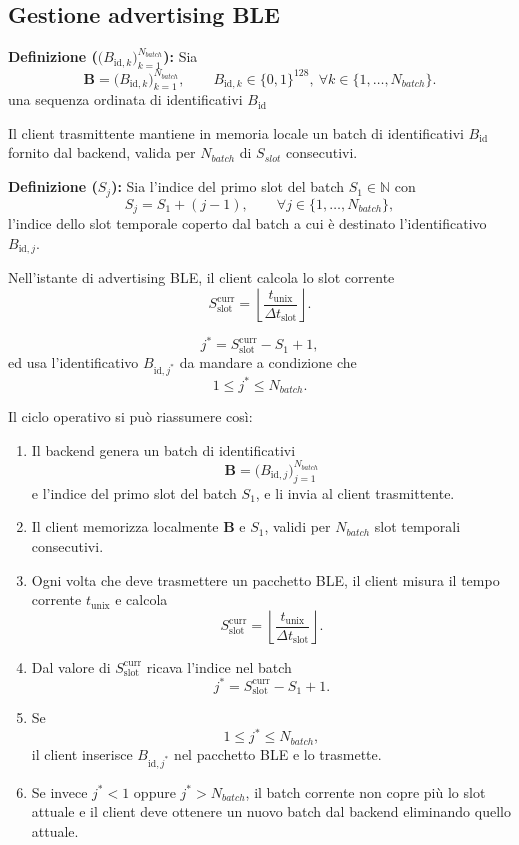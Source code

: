 \documentclass[a4paper,11pt]{article}
\begin{document}
\subsection{Gestione advertising BLE}
\textbf{Definizione (\(\bigl(B_{\text{id},k}\bigr)_{k=1}^{N_{batch}}\)):} Sia
\[
  \mathbf{B}
  = \bigl(B_{\text{id},k}\bigr)_{k=1}^{N_{batch}},
  \qquad B_{\text{id},k} \in \{0,1\}^{128},\ \forall k \in \{1,\dots,N_{batch}\}.
\]
una sequenza ordinata di identificativi $B_{\text{id}}$

Il client trasmittente mantiene in memoria locale un batch di identificativi \(B_{\text{id}}\) fornito dal backend, valida per $N_{batch}$ di $S_{slot}$ consecutivi.

\textbf{Definizione (\(S_j\)):} Sia l'indice del primo slot del batch \(S_1 \in \mathbb{N}\) con
\[
  S_j = S_1 + (j-1), \qquad \forall j \in \{1,\dots,N_{batch}\},
\]
l'indice dello slot temporale coperto dal batch a cui è destinato l'identificativo \(B_{\text{id},j}\).

Nell'istante di advertising BLE, il client calcola lo slot corrente
\[
  S_{\text{slot}}^{\text{curr}}
  = \left\lfloor \frac{t_{\text{unix}}}{\Delta t_{\text{slot}}} \right\rfloor.
\]

\[
  j^\ast = S_{\text{slot}}^{\text{curr}} - S_1 + 1,
\]
ed usa l'identificativo \(B_{\text{id},j^\ast}\) da mandare a condizione che
\[
  1 \le j^\ast \le N_{batch}.
\]

Il ciclo operativo si può riassumere così:
\begin{enumerate}
  \item Il backend genera un batch di identificativi
        \[
          \mathbf{B} = \bigl(B_{\text{id},j}\bigr)_{j=1}^{N_{batch}}
        \]
        e l'indice del primo slot del batch \(S_1\), e li invia al client trasmittente.

  \item Il client memorizza localmente \(\mathbf{B}\) e \(S_1\), validi per \(N_{batch}\) slot temporali consecutivi.

  \item Ogni volta che deve trasmettere un pacchetto BLE, il client misura il tempo corrente \(t_{\text{unix}}\) e calcola
        \[
          S_{\text{slot}}^{\text{curr}}
          = \left\lfloor \frac{t_{\text{unix}}}{\Delta t_{\text{slot}}} \right\rfloor.
        \]

  \item Dal valore di \(S_{\text{slot}}^{\text{curr}}\) ricava l’indice nel batch
        \[
          j^\ast = S_{\text{slot}}^{\text{curr}} - S_1 + 1.
        \]

  \item Se
        \[
          1 \le j^\ast \le N_{batch},
        \]
        il client inserisce \(B_{\text{id},j^\ast}\) nel pacchetto BLE e lo trasmette.

  \item Se invece \(j^\ast < 1\) oppure \(j^\ast > N_{batch}\), il batch corrente non copre più lo slot attuale e il client deve ottenere un nuovo batch dal backend eliminando quello attuale.
\end{enumerate}
\end{document}
